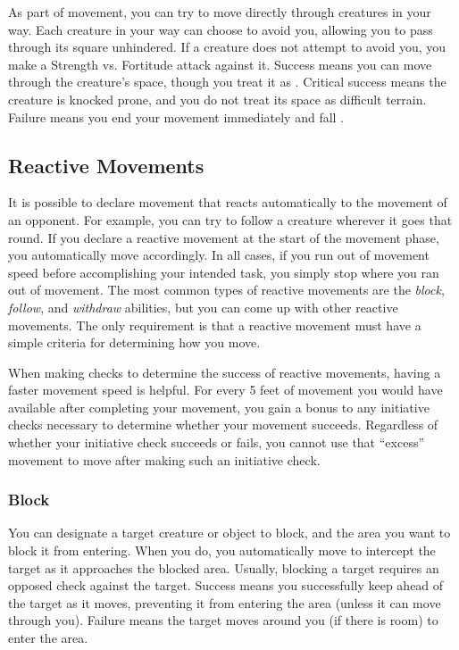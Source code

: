         \label{Overrun} As part of movement, you can try to move directly through creatures in your way.
        Each creature in your way can choose to avoid you, allowing you to pass through its square unhindered.
        If a creature does not attempt to avoid you, you make a Strength vs. Fortitude attack against it.
        Success means you can move through the creature's space, though you treat it as .
        Critical success means the creature is knocked prone, and you do not treat its space as difficult terrain.
        Failure means you end your movement immediately and fall \prone.

    \subsection{Reactive Movements}

        It is possible to declare movement that reacts automatically to the movement of an opponent.
        For example, you can try to follow a creature wherever it goes that round.
        If you declare a reactive movement at the start of the movement phase, you automatically move accordingly.
        In all cases, if you run out of movement speed before accomplishing your intended task, you simply stop where you ran out of movement.
        The most common types of reactive movements are the \textit{block}, \textit{follow}, and \textit{withdraw} abilities, but you can come up with other reactive movements.
        The only requirement is that a reactive movement must have a simple criteria for determining how you move.

        \label{Movement-Based Initiative} When making  checks to determine the success of reactive movements, having a faster movement speed is helpful.
        For every 5 feet of movement you would have available after completing your movement, you gain a  bonus to any initiative checks necessary to determine whether your movement succeeds.
        Regardless of whether your initiative check succeeds or fails, you cannot use that ``excess'' movement to move after making such an initiative check.

        \subsubsection{Block}\label{Block}
            You can designate a target creature or object to block, and the area you want to block it from entering.
            When you do, you automatically move to intercept the target as it approaches the blocked area.
            Usually, blocking a target requires an opposed  check against the target.
            Success means you successfully keep ahead of the target as it moves, preventing it from entering the area (unless it can move through you).
            Failure means the target moves around you (if there is room) to enter the area.

